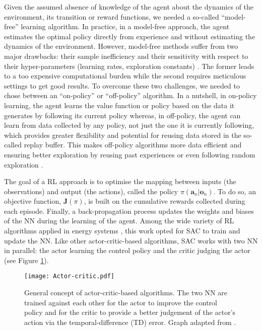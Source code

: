 Given the assumed absence of knowledge of the agent about the dynamics of the environment, \ie its transition or reward functions, we needed a so-called ``model-free'' learning algorithm. In practice, in a model-free approach, the agent estimates the optimal policy directly from experience and without estimating the dynamics of the environment. However, model-free methods suffer from two major drawbacks: their sample inefficiency and their sensitivity with respect to their hyper-parameters (\eg learning rates, exploration constants) \cite{haarnoja2018soft}. The former leads to a too expensive computational burden while the second requires meticulous settings to get good results.  To overcome these two challenges, we needed to chose between an ``on-policy'' or ``off-policy'' algorithm. In a nutshell, in on-policy learning, the agent learns the value function or policy based on the data it generates by following its current policy whereas, in off-policy, the agent can learn from data collected by any policy, not just the one it is currently following, which provides greater flexibility and potential for reusing data stored in the so-called replay buffer. This makes off-policy algorithms more data efficient and ensuring better exploration by reusing past experiences or even following random exploration \cite{haarnoja2018soft}.

The goal of a \gls{RL} approach is to optimise the mapping between inputs (\ie the observations) and output (\ie the actions), called the policy $\pi\left(\bm{a}_n | \bm{o}_n\right)$. To do so, an objective function, $\bm{J}(\pi)$, is built on the cumulative rewards collected during each episode. Finally, a back-propagation process updates the weights and biases of the \gls{NN} during the learning of the agent. Among the wide variety of \gls{RL} algorithms applied in energy systems \cite{perera2021applications}, this work opted for \gls{SAC} \cite{haarnoja2018soft} to train and update the \gls{NN}.  Like other actor-critic-based algorithms, \gls{SAC} works with two \gls{NN} in parallel: the actor learning the control policy and the critic judging the actor (see Figure \ref{fig:Actor-critic}).

\begin{figure}[!htbp]
\centering
\texttt{[image: Actor-critic.pdf]}
\caption{General concept of actor-critic-based algorithms. The two \gls{NN} are trained against each other for the actor to improve the control policy and for the critic to provide a better judgement of the actor's action via the temporal-difference (TD) error. Graph adapted from \cite{cao2020reinforcement}.}
\label{fig:Actor-critic}
\end{figure}

